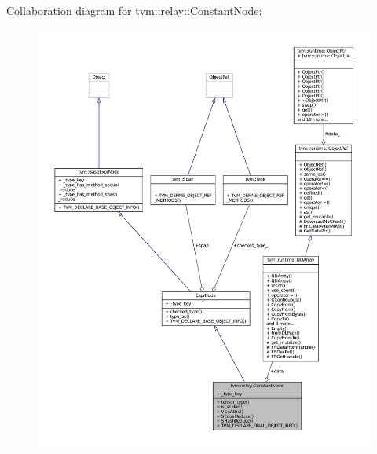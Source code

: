 Collaboration diagram for tvm\+:\+:relay\+:\+:Constant\+Node\+:
\nopagebreak
\begin{figure}[H]
\begin{center}
\leavevmode
\includegraphics[width=350pt]{classtvm_1_1relay_1_1ConstantNode__coll__graph}
\end{center}
\end{figure}

